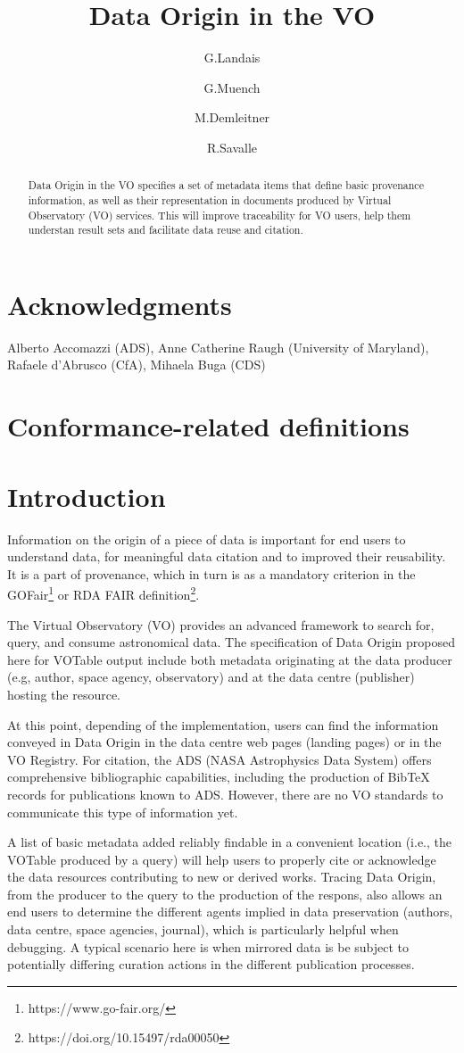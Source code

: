 \documentclass[11pt,a4paper]{ivoa}
\title{Data Origin in the VO}
\author{G.Landais}
\author{G.Muench}
\author{M.Demleitner}
\author{R.Savalle}
\begin{document}
\begin{abstract}
Data Origin in the VO specifies a set of metadata items that define basic
provenance information, as well as their representation in documents produced
by Virtual Observatory (VO) services.  This will improve traceability for VO
users, help them understan result sets and facilitate data reuse and citation.

\end{abstract}


\section*{Acknowledgments}
Alberto Accomazzi (ADS), Anne Catherine Raugh (University of Maryland), Rafaele d'Abrusco (CfA), Mihaela Buga (CDS)

\section*{Conformance-related definitions}


\section{Introduction}

Information on the origin of a piece of data is important for end users to understand data, for meaningful data citation and to improved their reusability.  It is a part of provenance, which in turn is as a mandatory criterion in the GOFair\footnote{https://www.go-fair.org/} or RDA FAIR definition\footnote{https://doi.org/10.15497/rda00050}.

The Virtual Observatory (VO) provides an advanced framework to search for, query, and consume astronomical data.  The specification of Data Origin proposed here for VOTable output include both metadata originating at the data producer (e.g, author, space agency, observatory) and at the data centre (publisher) hosting the resource.

At this point, depending of the implementation, users can find the information conveyed in Data Origin in the data centre web pages (landing pages) or in the VO Registry.  For citation, the ADS (NASA Astrophysics Data System) offers comprehensive bibliographic capabilities, including the production of BibTeX records for publications known to ADS.  However, there are no VO standards to communicate this type of information yet.

A list of basic metadata added reliably findable in a convenient location (i.e.,
the VOTable produced by a query) will help users to properly cite or
acknowledge the data resources contributing to new or derived works.
Tracing Data Origin, from the producer to the query to the production of the respons, also allows an end users to determine the different agents implied in data preservation (authors, data centre, space agencies, journal), which is particularly helpful when debugging.  A typical scenario here is when mirrored data is be subject to potentially differing curation actions in the different publication processes.
\end{document}
